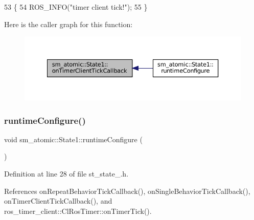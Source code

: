 \begin{DoxyCode}
53     \{
54         ROS\_INFO(\textcolor{stringliteral}{"timer client tick!"});
55     \}
\end{DoxyCode}
Here is the caller graph for this function\+:
\nopagebreak
\begin{figure}[H]
\begin{center}
\leavevmode
\includegraphics[width=350pt]{structsm__atomic_1_1State1_adea28f0a0fcedb210a29656f53aeee09_icgraph}
\end{center}
\end{figure}
\mbox{\label{structsm__atomic_1_1State1_a47c2e651bb707f14d9b32f92c44f8ebc}} 
\subsubsection{\texorpdfstring{runtime\+Configure()}{runtimeConfigure()}}
{\footnotesize\ttfamily void sm\+\_\+atomic\+::\+State1\+::runtime\+Configure (\begin{DoxyParamCaption}{ }\end{DoxyParamCaption})\hspace{0.3cm}{\ttfamily [inline]}}



Definition at line 28 of file st\+\_\+state\+\_.\+h.



References on\+Repeat\+Behavior\+Tick\+Callback(), on\+Single\+Behavior\+Tick\+Callback(), on\+Timer\+Client\+Tick\+Callback(), and ros\+\_\+timer\+\_\+client\+::\+Cl\+Ros\+Timer\+::on\+Timer\+Tick().


